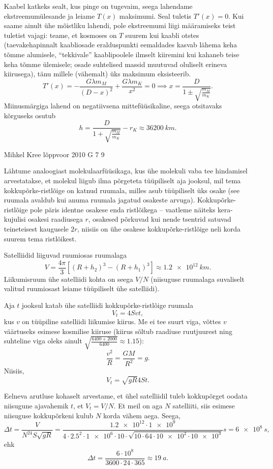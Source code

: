 \documentclass[11pt, twoside]{article}
\begin{document}
{{Kaabel katkeks sealt, kus pinge on tugevaim, seega lahendame
ekst\-ree\-mum\-üles\-an\-de
ja leiame $T(x)$ maksimumi. Seal tuletis $T'(x)=0$. Kui saame ainult ühe mõistliku lahendi, pole
ekstreemumi liigi määramiseks teist tuletist vajagi: teame, et kosmoses on $T$
suurem kui kaabli otstes (taevakehapinnalt kaabliosade eralduspunkti
eemaldades kasvab lähema keha tõmme alumisele, \enquote{tekkivale} kaablipoolele ilmselt kiiremini
kui kahaneb teise keha tõmme ülemisele; osade suhtelised massid muutuvad
oluliselt erineva kiirusega), tänu millele (vähemalt) üks maksimum eksisteerib.
\[ 
T'(x) = - \frac{ G\lambda m_M }{ (D-x)^2 } + \frac{ G\lambda m_K }{ x^2 } = 0
\implies x = \frac{D}{1 \pm \sqrt{\frac{m_M}{m_K}}}.
\]
Miinusmärgiga lahend on negatiivsena mittefüüsikaline, seega otsitavaks
kõr\-gu\-seks osutub
\[ 
h = \frac{D}{1 + \sqrt{\frac{m_M}{m_K}}} - r_K \approx
\SI{36200}{km}.
\]
\fi
}

{Mihkel Kree} %
{lõppvoor} %
{2010} %
{G 7} %
{9} %
{

\ifSolution
Lähtume analoogiast molekulaarfüüsikaga, kus ühe molekuli vaba tee hindamisel arvestatakse, et molekul liigub ilma põrgeteta tüüpiliselt aja jooksul, mil tema kokkupõrke-ristlõige on katnud ruumala, milles asub tüüpiliselt üks osake (see ruumala avaldub kui anuma ruumala jagatud osakeste arvuga). Kokkupõrke-ristlõige pole päris identne osakese enda ristlõikega -- vaatleme näiteks kera-kujulisi osakesi raadiusega $r$, osakesed põrkuvad kui nende tsentrid satuvad teineteisest kaugusele $2r$, niisiis on ühe osakese kokkupõrke-ristlõige neli korda suurem tema ristlõikest.

Satelliidid liiguvad ruumiosas ruumalaga
\[ V=\frac{4\pi}{3}\left[(R+h_2)^3-(R+h_1)^3\right]\approx \SI{1.2e12}{km}.\]
Liikumisruum ühe satelliidi kohta on seega $V/N$ (niisuguse ruumalaga suvaliselt valitud ruumiosast leiame tüüpiliselt ühe satelliidi).

Aja $t$ jooksul katab ühe satelliidi kokkupõrke-ristlõige ruumala
\[V_t=4Svt,\]
kus $v$ on tüüpiline satelliidi liikumise kiirus. Me ei tee suurt viga, võttes $v$ väärtuseks esimese kosmilise kiiruse (kiirus sõltub raadiuse ruutjuurest ning suhteline viga oleks ainult \mbox{$\sqrt{\frac{6400+2000}{6400}}\approx\num{1.15}$}):
\[\frac{v^2}{R}=\frac{GM}{R^2}=g.\]
Niisiis,
\[V_t=\sqrt{gR}4St.\]

Eelneva arutluse kohaselt arvestame, et ühel satelliidil tuleb kokkupõrget oodata niisugune ajavahemik $t$, et $V_t=V/N$. Et meil on aga $N$ satelliiti, siis esimese niisuguse kokkupõrkeni kulub $N$ korda vähem aega. Seega,
\[
\Delta t=\frac{V}{N^24S\sqrt{gR}}=\frac{\num{1.2e12}\cdot\num{1e9}}{\num{4}\cdot\num{2.5}^2\cdot\num{1e6}\cdot \num{10}\cdot \sqrt{\num{10}\cdot \num{64} \cdot\num{10e2}\cdot \num{10e3}}}s=\SI{6e8}{s},
\]
ehk
\[
\Delta t=\frac{6\cdot10^{8}}{3600\cdot24\cdot365}\approx \SI{19}{a}.
\]
\fi
}

}
\end{document}
